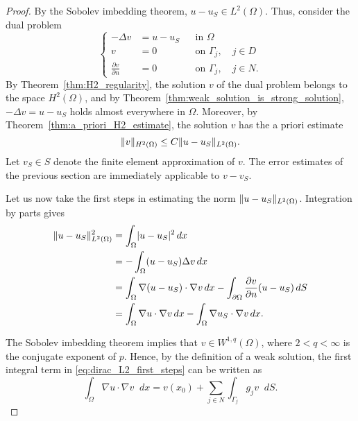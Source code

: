 \documentclass[english, 12pt, a4paper, sci, utf8, a-2b, online]{aaltothesis}
\theoremstyle{definition}
\theoremstyle{plain}
\DeclarePairedDelimiter\abs{\lvert}{\rvert}
\DeclarePairedDelimiter\norm{\lVert}{\rVert}
\newcommand*\diff{\mathop{}\!d}
\numberwithin{equation}{section}
\begin{document}
\begin{proof}
    By the Sobolev imbedding theorem, $u - u_S \in L^2(\Omega)$.
    Thus, consider the dual problem
    \begin{equation*}
        \left\{
            \begin{aligned}
                -\Delta v &= u - u_S && \text{in } \Omega \\
                v &= 0 && \text{on } \Gamma_j, \quad j \in D \\
                \frac{\partial v}{\partial n} &= 0 && \text{on } \Gamma_j,
                \quad j \in N.
            \end{aligned}
        \right.
    \end{equation*}
    By Theorem~\ref{thm:H2_regularity}, the solution $v$ of the dual problem
    belongs to the space $H^2(\Omega)$,
    and by Theorem~\ref{thm:weak_solution_is_strong_solution},
    $-\Delta v = u-u_S$ holds almost everywhere in $\Omega$.
    Moreover, by Theorem~\ref{thm:a_priori_H2_estimate},
    the solution $v$ has the a priori estimate
    \begin{equation}
        \label{eq:dirac_L2_conv_dual_apriori}
        \norm{v}_{H^2(\Omega)} \leq C \norm{u - u_S}_{L^2(\Omega)}.
    \end{equation} 
    Let $v_S \in S$ denote the finite element approximation of $v$.
    The error estimates of the previous section are immediately applicable
    to $v - v_S$.

    Let us now take the first steps in estimating the norm
    $\norm{u - u_S}_{L^2(\Omega)}$. Integration by parts gives
    \begin{align}
        \norm{u - u_S}_{L^2(\Omega)}^2
        &= \int_{\Omega} \abs{u - u_S}^2 \diff x \nonumber \\
        &= -\int_{\Omega} (u - u_S) \Delta v \diff x \nonumber \\
        &= \int_{\Omega} \nabla (u-u_S) \cdot \nabla v \diff x
        - \int_{\partial \Omega} \frac{\partial v}{\partial n} (u - u_S) \diff S
            \nonumber \\
        \label{eq:dirac_L2_first_steps}
        &= \int_{\Omega} \nabla u \cdot \nabla v \diff x
            - \int_{\Omega} \nabla u_S \cdot \nabla v \diff x.
    \end{align}
    
    The Sobolev imbedding theorem implies that $v \in W^{1,q}(\Omega)$,
    where $2 < q < \infty$ is the conjugate exponent of $p$.
    Hence, by the definition of a weak solution,
    the first integral term in \eqref{eq:dirac_L2_first_steps} can be written as
    \begin{equation*}
        \int_{\Omega} \nabla u \cdot \nabla v \diff x
        = v(x_0) + \sum_{j \in N} \int_{\Gamma_j} g_j v \diff S.
    \end{equation*}
    

\end{proof}
\end{document}
